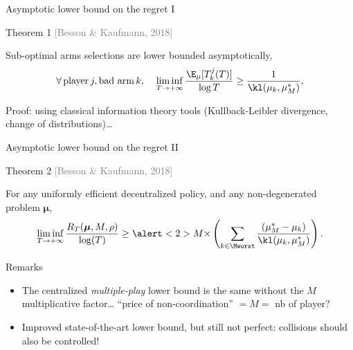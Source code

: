 \documentclass[12pt,english,ignorenonframetext,aspectratio=169,]{beamer}
\providecommand{\tightlist}{%
  \setlength{\itemsep}{0pt}\setlength{\parskip}{0pt}}
\begin{document}
\begin{frame}{Asymptotic lower bound on the regret I}

\begin{block}{Theorem 1
  \hfill{}\textcolor{gray}{[Besson \& Kaufmann, 2018]}}

  Sub-optimal arms selections are lower bounded asymptotically,
  \[\forall\, \text{player}\, j, \text{bad arm}\,k,\;\;\;\; \mathop{\lim\inf}\limits_{T \to +\infty} \frac{\E_{\mu}[T_k^j(T)]}{\log T} \geq \frac{1}{\kl(\mu_k, \mu_M^*)},\]

\end{block}

Proof: using classical information theory tools (Kullback-Leibler divergence, change of distributions)\dots
{}

\end{frame}

\begin{frame}{Asymptotic lower bound on the regret II}

\begin{block}{Theorem 2
\hfill{}\textcolor{gray}{[Besson \& Kaufmann, 2018]}}

\small{For any uniformly efficient decentralized policy, and any
non-degenerated problem \(\boldsymbol{\mu}\),} \vspace*{-10pt}
\[ \mathop{\lim\inf}\limits_{T \to +\infty} \frac{R_T(\boldsymbol{\mu}, M, \rho)}{\log(T)} \geq
\alert<2>{M \times} \left( \sum_{k \in \Mworst} \frac{(\mu_M^* -  \mu_k)}{\kl(\mu_k, \mu_M^*)} \right) . \]
\end{block}

\pause

\begin{block}{Remarks}

\begin{itemize}\tightlist
\item
  The centralized \emph{multiple-play} lower bound is the same without
  the \alert{\(M\) multiplicative factor}\ldots{}
  \hook \alert{``price of non-coordination''} \(= M =\) nb of player?
\item
  Improved state-of-the-art lower bound, but still not perfect:
  collisions should also be controlled!
\end{itemize}

\end{block}

\end{frame}
\end{document}
